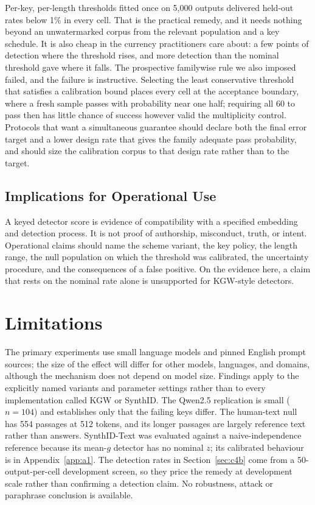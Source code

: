 \documentclass[conference]{IEEEtran}
\begin{document}
Per-key, per-length thresholds fitted once on 5,000 outputs delivered held-out
rates below 1\% in every cell. That is the practical remedy, and it needs nothing
beyond an unwatermarked corpus from the relevant population and a key schedule.
It is also cheap in the currency practitioners care about: a few points of
detection where the threshold rises, and more detection than the nominal
threshold gave where it falls.
The prospective familywise rule we also imposed failed, and the failure is
instructive. Selecting the least conservative threshold that satisfies a
calibration bound places every cell at the acceptance boundary, where a fresh
sample passes with probability near one half; requiring all 60 to pass then has
little chance of success however valid the multiplicity control. Protocols that
want a simultaneous guarantee should declare both the final error target and a
lower design rate that gives the family adequate pass probability, and should
size the calibration corpus to that design rate rather than to the target.

\subsection{Implications for Operational Use}

A keyed detector score is evidence of compatibility with a specified embedding
and detection process. It is not proof of authorship, misconduct, truth, or
intent. Operational claims should name the scheme variant, the key policy, the
length range, the null population on which the threshold was calibrated, the
uncertainty procedure, and the consequences of a false positive. On the evidence
here, a claim that rests on the nominal rate alone is unsupported for KGW-style
detectors.

\section{Limitations}

The primary experiments use small language models and pinned English prompt
sources; the size of the effect will differ for other models, languages, and
domains, although the mechanism does not depend on model size. Findings apply to
the explicitly named variants and parameter settings rather than to every
implementation called KGW or SynthID. The Qwen2.5 replication is small ($n=104$)
and establishes only that the failing keys differ. The human-text null has 554
passages at 512 tokens, and its longer passages are largely reference text rather
than answers. SynthID-Text was evaluated against a naive-independence reference
because its mean-$g$ detector has no nominal $z$; its calibrated behaviour is in
Appendix~\ref{app:a1}. The detection rates in Section~\ref{sec:c4b} come from a
50-output-per-cell development screen, so they price the remedy at development
scale rather than confirming a detection claim. No robustness, attack or
paraphrase conclusion is available.
\end{document}
